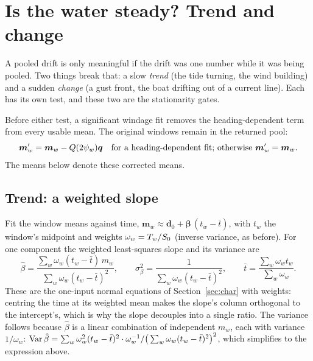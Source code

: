 \section{Is the water steady? Trend and change}
\label{sec:cond-stationary}

A pooled drift is only meaningful if the drift was one number while it was being
pooled. Two things break that: a slow \emph{trend} (the tide turning, the wind
building) and a sudden \emph{change} (a gust front, the boat drifting out of a
current line). Each has its own test, and these two are the stationarity gates.

Before either test, a significant windage fit removes the heading-dependent
term from every usable mean. The original windows remain in the returned pool:
\[
 \bm m'_w=\bm m_w-Q(2\psi_w)\bm q
 \quad\text{for a heading-dependent fit; otherwise }\bm m'_w=\bm m_w.
\]
The means below denote these corrected means.

\subsection{Trend: a weighted slope}

Fit the window means against time, $\bm m_w \approx \bm d_0 + \bm\beta\,(t_w - \bar t)$,
with $t_w$ the window's midpoint and weights $\omega_w = T_w/S_0$ (inverse
variance, as before). For one component the weighted least-squares slope and its
variance are
\[
  \hat\beta = \frac{\sum_w \omega_w (t_w - \bar t)\,m_w}{\sum_w \omega_w (t_w - \bar t)^2},\qquad
  \sigma_\beta^2 = \frac{1}{\sum_w \omega_w (t_w-\bar t)^2},\qquad
  \bar t = \frac{\sum_w\omega_w t_w}{\sum_w\omega_w}.
\]
These are the one-input normal equations of Section~\ref{sec:char} with weights:
centring the time at its weighted mean makes the slope's column orthogonal to the
intercept's, which is why the slope decouples into a single ratio. The variance
follows because $\hat\beta$ is a linear combination of independent $m_w$, each with
variance $1/\omega_w$:
$\operatorname{Var}\hat\beta = \sum_w \omega_w^2 (t_w-\bar t)^2\cdot\omega_w^{-1}/\big(\sum_w\omega_w(t_w-\bar t)^2\big)^2$,
which simplifies to the expression above.


